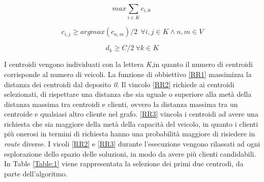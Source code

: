 \documentclass[]{article}
\begin{document}
\begin{equation}  \label{RR1}
max \sum_{i \in K} c_{i,0} \ 
\end{equation}

\begin{equation} \label{RR2}
c_{i,j} \geq argmax(c_{n,m})/2 \ \ \forall i,j \in K \wedge n,m \in V
\end{equation}


\begin{equation}\label{RR3}
 d_{k} \geq C/2 \ \forall k \in K  
\end{equation}

I centroidi vengono individuati con la lettera \emph{K},in quanto il numero di centroidi corrisponde al numero di veicoli. La funzione di obbiettivo \ref{RR1} massimizza la distanza dei centroidi dal deposito \emph{0}.
Il vincolo \ref{RR2} richiede ai centroidi selezionati, di rispettare una distanza che sia uguale o superiore alla metà della distanza massima tra centroidi e clienti, ovvero la distanza massima tra un centroide e qualsiasi altro cliente nel grafo. \ref{RR3} vincola i centroidi ad avere una richiesta che sia maggiore della metà della capacità del veicolo, in quanto i clienti più onerosi in termini di richiesta hanno una probabilità maggiore di risiedere in \emph{route} diverse.
I vicoli \ref{RR2} e \ref{RR3} durante l'esecuzione vengono rilassati ad ogni esplorazione dello spazio delle soluzioni, in modo da avere più clienti candidabili. In Table \ref{Table:1} viene rappresentata la selezione dei primi due centrodi, da parte dell'algoritmo.




\newpage
\end{document}
